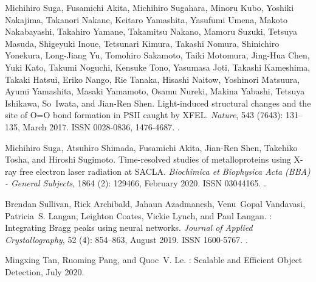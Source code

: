 \documentclass[a4paper]{article}
\begin{document}
\begin{thebibliography}{33}
Michihiro Suga, Fusamichi Akita, Michihiro Sugahara, Minoru Kubo, Yoshiki
  Nakajima, Takanori Nakane, Keitaro Yamashita, Yasufumi Umena, Makoto
  Nakabayashi, Takahiro Yamane, Takamitsu Nakano, Mamoru Suzuki, Tetsuya
  Masuda, Shigeyuki Inoue, Tetsunari Kimura, Takashi Nomura, Shinichiro
  Yonekura, Long-Jiang Yu, Tomohiro Sakamoto, Taiki Motomura, Jing-Hua Chen,
  Yuki Kato, Takumi Noguchi, Kensuke Tono, Yasumasa Joti, Takashi Kameshima,
  Takaki Hatsui, Eriko Nango, Rie Tanaka, Hisashi Naitow, Yoshinori Matsuura,
  Ayumi Yamashita, Masaki Yamamoto, Osamu Nureki, Makina Yabashi, Tetsuya
  Ishikawa, So~Iwata, and Jian-Ren Shen.
\newblock Light-induced structural changes and the site of {{O}}={{O}} bond
  formation in {{PSII}} caught by {{XFEL}}.
\newblock \emph{Nature}, 543 (7643): 131--135, March 2017.
\newblock ISSN 0028-0836, 1476-4687.
\newblock {}.

Michihiro Suga, Atsuhiro Shimada, Fusamichi Akita, Jian-Ren Shen, Takehiko
  Tosha, and Hiroshi Sugimoto.
\newblock Time-resolved studies of metalloproteins using {{X-ray}} free
  electron laser radiation at {{SACLA}}.
\newblock \emph{Biochimica et Biophysica Acta (BBA) - General Subjects},
  1864 (2): 129466, February 2020.
\newblock ISSN 03044165.
\newblock {}.

Brendan Sullivan, Rick Archibald, Jahaun Azadmanesh, Venu~Gopal Vandavasi,
  Patricia~S. Langan, Leighton Coates, Vickie Lynch, and Paul Langan.
: Integrating {{Bragg}} peaks using neural networks.
\newblock \emph{Journal of Applied Crystallography}, 52 (4):
  854--863, August 2019.
\newblock ISSN 1600-5767.
\newblock {}.

Mingxing Tan, Ruoming Pang, and Quoc~V. Le.
: {{Scalable}} and {{Efficient Object Detection}},
  July 2020.


\end{thebibliography}
\end{document}
